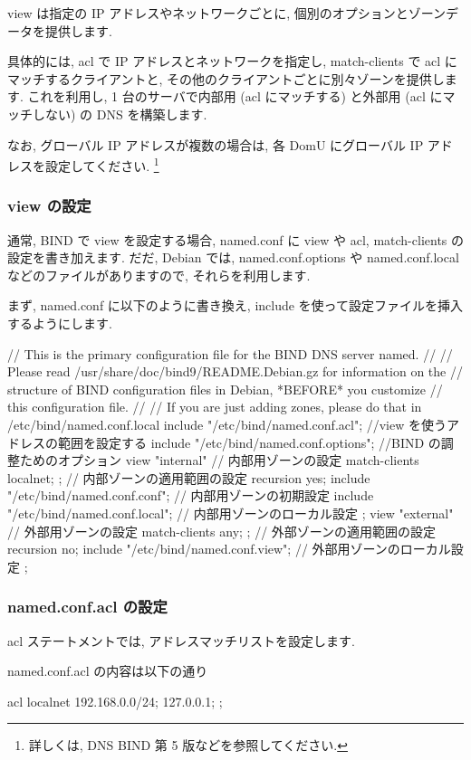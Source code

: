 \documentclass[mingoth,a4paper]{jsarticle}
\begin{document}
view は指定の IP アドレスやネットワークごとに, 個別のオプションとゾーンデータを提供します.

具体的には, acl で IP アドレスとネットワークを指定し, match-clients で acl にマッチするクライアントと, その他のクライアントごとに別々ゾーンを提供します. これを利用し, 1 台のサーバで内部用 (acl にマッチする) と外部用 (acl にマッチしない) の DNS を構築します.

なお, グローバル IP アドレスが複数の場合は, 各 DomU にグローバル IP アドレスを設定してください. \footnote{詳しくは, DNS BIND 第 5 版などを参照してください. }

\subsubsection{view の設定}
通常, BIND で view を設定する場合, named.conf に view や acl, match-clients の設定を書き加えます. だだ, Debian では, named.conf.options や named.conf.local などのファイルがありますので, それらを利用します.

まず, named.conf に以下のように書き換え, include を使って設定ファイルを挿入するようにします.
\begin{commandline}
// This is the primary configuration file for the BIND DNS server named.
//
// Please read /usr/share/doc/bind9/README.Debian.gz for information on the 
// structure of BIND configuration files in Debian, *BEFORE* you customize 
// this configuration file.
//
// If you are just adding zones, please do that in /etc/bind/named.conf.local
include "/etc/bind/named.conf.acl";  //view を使うアドレスの範囲を設定する
include "/etc/bind/named.conf.options";  //BIND の調整ためのオプション
view "internal"{  // 内部用ゾーンの設定
	match-clients { localnet; };  // 内部ゾーンの適用範囲の設定
	recursion yes;
include "/etc/bind/named.conf.conf";  // 内部用ゾーンの初期設定
include "/etc/bind/named.conf.local";  // 内部用ゾーンのローカル設定
};
view "external" {  // 外部用ゾーンの設定
	match-clients { any; };  // 外部ゾーンの適用範囲の設定
	recursion no;
include "/etc/bind/named.conf.view"; // 外部用ゾーンのローカル設定
};
\end{commandline}

\subsubsection{named.conf.acl の設定}
acl ステートメントでは, アドレスマッチリストを設定します.

named.conf.acl の内容は以下の通り
\begin{commandline}
acl localnet{ 
	192.168.0.0/24; 
	127.0.0.1; 
};
\end{commandline}
\end{document}
